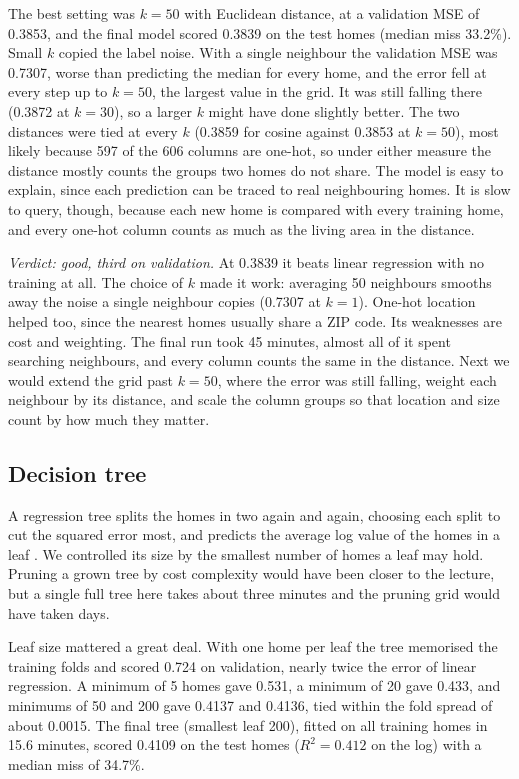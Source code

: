 \documentclass[sigconf,nonacm,10pt]{acmart}
\begin{document}
The best setting was $k = 50$ with Euclidean distance, at a validation MSE of 0.3853, and the final model scored 0.3839 on the test homes (median miss 33.2\%). Small $k$ copied the label noise. With a single neighbour the validation MSE was 0.7307, worse than predicting the median for every home, and the error fell at every step up to $k = 50$, the largest value in the grid. It was still falling there (0.3872 at $k = 30$), so a larger $k$ might have done slightly better. The two distances were tied at every $k$ (0.3859 for cosine against 0.3853 at $k = 50$), most likely because 597 of the 606 columns are one-hot, so under either measure the distance mostly counts the groups two homes do not share. The model is easy to explain, since each prediction can be traced to real neighbouring homes. It is slow to query, though, because each new home is compared with every training home, and every one-hot column counts as much as the living area in the distance.

\emph{Verdict: good, third on validation.} At 0.3839 it beats linear regression with no training at all. The choice of $k$ made it work: averaging 50 neighbours smooths away the noise a single neighbour copies (0.7307 at $k = 1$). One-hot location helped too, since the nearest homes usually share a ZIP code. Its weaknesses are cost and weighting. The final run took 45 minutes, almost all of it spent searching neighbours, and every column counts the same in the distance. Next we would extend the grid past $k = 50$, where the error was still falling, weight each neighbour by its distance, and scale the column groups so that location and size count by how much they matter.

\subsection{Decision tree}
A regression tree splits the homes in two again and again, choosing each split to cut the squared error most, and predicts the average log value of the homes in a leaf \cite{breiman1984}. We controlled its size by the smallest number of homes a leaf may hold. Pruning a grown tree by cost complexity would have been closer to the lecture, but a single full tree here takes about three minutes and the pruning grid would have taken days.

Leaf size mattered a great deal. With one home per leaf the tree memorised the training folds and scored 0.724 on validation, nearly twice the error of linear regression. A minimum of 5 homes gave 0.531, a minimum of 20 gave 0.433, and minimums of 50 and 200 gave 0.4137 and 0.4136, tied within the fold spread of about 0.0015. The final tree (smallest leaf 200), fitted on all training homes in 15.6 minutes, scored 0.4109 on the test homes ($R^2 = 0.412$ on the log) with a median miss of 34.7\%.
\end{document}
